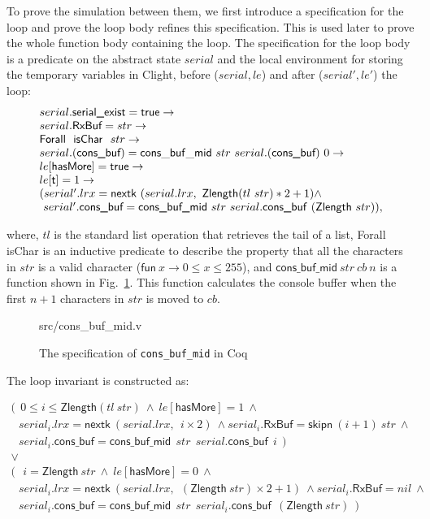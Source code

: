 To prove the simulation between them, we first introduce a specification for the
loop and prove the loop body refines this specification. This is used later to
prove the whole function body containing the loop. The specification for the
loop body is a predicate on the abstract state $serial$ and the local
environment for storing the temporary variables in Clight, before ($serial, le$)
and after ($serial', le'$) the loop:
\[
\begin{array}{l}
	serial.\textsf{serial\_exist} = \textsf{true} \rightarrow \\
	serial.\textsf{RxBuf} = str \rightarrow \\
	\textsf{Forall}~~ \textsf{isChar}~~ str \rightarrow \\
	serial.(\textsf{cons\_buf}) = \mathsf{cons\_buf\_mid}~ str~ serial.(\textsf{cons\_buf})~ 0 \rightarrow \\
	le[\textsf{hasMore}] = \textsf{true} \rightarrow \\
	le[\textsf{t}] = 1 \rightarrow \\
	(serial'.lrx = \textsf{nextk} ~(serial.lrx, ~\textsf{Zlength} (tl~ str) * 2 + 1) \wedge \\
	 ~serial'.\textsf{cons\_buf} = \textsf{cons\_buf\_mid}~ str~ serial.\textsf{\textsf{cons\_buf}}~ (\textsf{Zlength}~ str)),
\end{array}
\]

\noindent{}where, $tl$ is the standard list operation that retrieves the tail of
a list, \textsf{Forall  isChar} is an inductive predicate to describe the
property that all the characters in $str$ is a valid character ($\textsf{fun}~x
\rightarrow 0 \le x \le 255$), and $\textsf{cons\_buf\_mid}~ str~ cb~ n$ is a
function shown in Fig.~\ref{fig:cons_buf_mid_v}. This function calculates the
console buffer when the first $n+1$ characters in $str$ is moved to $cb$.

\begin{figure}
	 {src/cons_buf_mid.v}
	\caption{The specification of \texttt{cons\_buf\_mid} in Coq}
	\label{fig:cons_buf_mid_v}
\end{figure}

The loop invariant is constructed as:

\[
\begin{array}{l}
	(~~0 \le i \le \textsf{Zlength} (tl~ str)~\wedge~
	le[\textsf{hasMore}] = 1 ~\wedge \\
	~~~serial_{i}.lrx = \textsf{nextk}~ (serial.lrx, ~~i \times 2) ~\wedge 
	serial_{i}.\textsf{RxBuf} = \textsf{skipn}~(i + 1)~str ~\wedge\\
	~~~serial_{i}.\textsf{cons\_buf} = \textsf{cons\_buf\_mid} ~~str ~~serial.\textsf{cons\_buf} ~~i~~) \\
	\vee \\
	(~~~i = \textsf{Zlength}~ str ~\wedge
	~le[\textsf{hasMore}] = 0 ~\wedge \\
	~~~serial_{i}.lrx = \textsf{nextk} ~(serial.lrx, ~~(\textsf{Zlength}~ str) \times 2 + 1) ~\wedge
	serial_{i}.\textsf{RxBuf} = nil ~\wedge \\
	~~~serial_{i}.\textsf{cons\_buf} = \textsf{cons\_buf\_mid}~~ str~~ serial_{i}.\textsf{cons\_buf}~~ (\textsf{Zlength}~ str)~~)
\end{array}
\]

